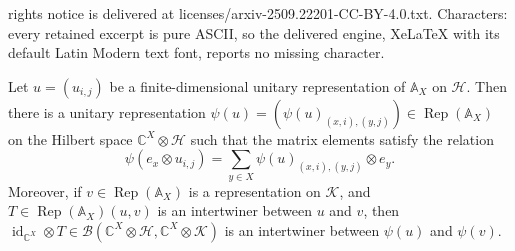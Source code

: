 \documentclass[10pt,a4paper]{amsart}
\def\A{\mathbb{A}}
\def\BB{\mathcal{B}}
\def\C{\mathbb{C}}
\def\HH{\mathcal{H}}
\def\KK{\mathcal{K}}
\def\Rep{\operatorname{Rep}}
\def\id{\operatorname{id}}
\begin{document}
rights notice is delivered at licenses/arxiv-2509.22201-CC-BY-4.0.txt. Characters: every retained excerpt is pure ASCII, so the delivered engine, XeLaTeX with its default Latin Modern text font, reports no missing character.
\begin{prop} \label{prop:psiobj}
	Let $u = (u_{i,j})$ be a finite-dimensional unitary representation of $\A_X$ on $\HH$. Then there is a unitary representation $\psi(u) = (\psi(u)_{(x,i),(y,j)}) \in \Rep(\A_X)$ on the Hilbert space $\C^X\otimes \HH$
	such that the matrix elements satisfy the relation
	\[
	\psi(e_x\otimes u_{i,j}) = \sum_{y\in X}\psi(u)_{(x,i),(y,j)} \otimes e_y.
	\]
	Moreover, if $v \in \Rep(\A_X)$ is a representation on $\KK$, and $T\in\Rep(\A_X)(u,v)$ is an intertwiner between $u$ and $v$, then $	\id_{\C^X}\otimes T \in \BB(\C^X\otimes\HH,\C^X\otimes\KK)$	is an intertwiner between $\psi(u)$ and $\psi(v)$.
\end{prop}
\end{document}
